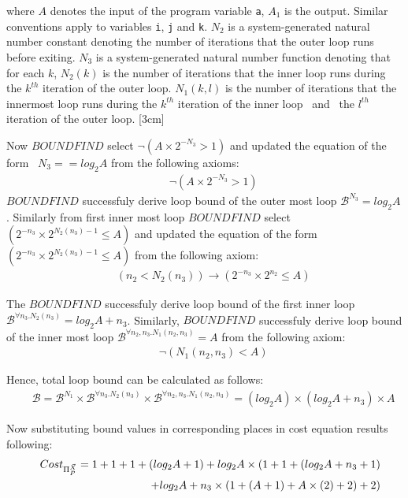 \documentclass[12pt]{extarticle}
\theoremstyle{definition}
\begin{document}
where $A$ denotes the input of the program variable \verb-a-, $A_1$ is the output. Similar conventions apply to variables \verb-i-, \verb-j- and \verb-k-. $N_2$ is a system-generated natural number constant denoting
the number of iterations that the outer loop runs before exiting. $N_3$ is a system-generated natural number function denoting that
for each $k$, $N_2(k)$ is
the number of iterations that the inner loop runs during the $k^{th}$ iteration
of the outer loop. $N_1(k,l)$ is
the number of iterations that the innermost loop runs during the $k^{th}$ iteration
of the inner loop  and  the $l^{th}$ iteration
of the outer loop.
[3cm]

Now $BOUNDFIND$ select $\neg (A\times 2^{-N_3}>1)$ and updated the equation of the form  $N_3==log_{2}A$ from the following axioms:
\begin{eqnarray*}   
	&&\neg (A\times 2^{-N_3}>1)
\end{eqnarray*}
$BOUNDFIND$ successfuly derive loop bound of the outer most loop $\mathcal{B}^{N_3}=log_{2}A$. Similarly from first inner most loop $BOUNDFIND$ select $(2^{-n_3}\times 2^{N_2(n_3)-1}\leq A)$ and updated the equation of the form  $(2^{-n_3}\times 2^{N_2(n_3)-1}\leq A)$ from the following axiom: 
\begin{eqnarray*}   
	&&(n_2<N_2(n_3)) \rightarrow (2^{-n_3}\times 2^{n_2}\leq A)
\end{eqnarray*}

The $BOUNDFIND$ successfuly derive loop bound of the first inner loop $\mathcal{B}^{\forall n_3. N_2(n_3)}=log_{2}A+n_3$. Similarly, $BOUNDFIND$ successfuly derive loop bound of the inner most loop $\mathcal{B}^{\forall n_2,n_3. N_1(n_2,n_3)}=A$ from the following axiom:
\begin{eqnarray*}   
	&&\neg (N_1(n_2,n_3)<A)
\end{eqnarray*}



Hence, total loop bound can be calculated as follows:
\begin{eqnarray*}
	&&\mathcal{B}=\mathcal{B}^{N_1}\times \mathcal{B}^{\forall n_3. N_2(n_3)} \times \mathcal{B}^{\forall n_2,n_3. N_1(n_2,n_3)}= (log_{2}A) \times (log_{2}A+n_3) \times A
\end{eqnarray*}


Now substituting bound values in corresponding places in cost equation results following:
\begin{eqnarray*}
	&&Cost_{\Pi_{P}^{\vec{X}}}=1+1+1+(log_{2}A+1)+log_{2}A\times(1+1+(log_{2}A+n_3+1)\\
	&&\hspace*{5em}+log_{2}A+n_3\times(1+(A+1)+A\times(2)+2)+2)
\end{eqnarray*}
\end{document}
